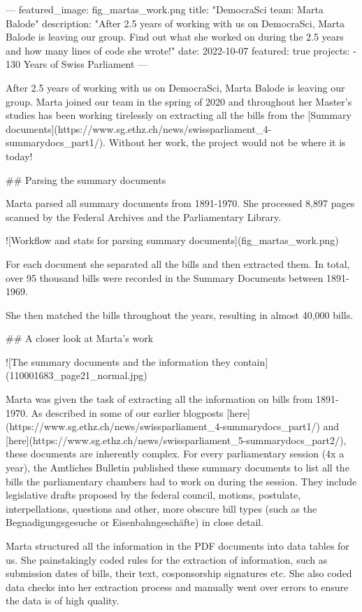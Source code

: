 ---
featured_image: fig_martas_work.png
title: "DemocraSci team: Marta Balode"
description: "After 2.5 years of working with us on DemocraSci, Marta Balode is leaving our group. Find out what she worked on during the 2.5 years and how many lines of code she wrote!"
date: 2022-10-07
featured: true
projects: 
  - 130 Years of Swiss Parliament
---

After 2.5 years of working with us on DemocraSci, Marta Balode is leaving our group. 
Marta joined our team in the spring of 2020 and throughout her Master's studies has been working tirelessly on extracting all the bills from the [Summary documents](https://www.sg.ethz.ch/news/swissparliament_4-summarydocs_part1/).
Without her work, the project would not be where it is today! 


## Parsing the summary documents

Marta parsed all summary documents from 1891-1970. She processed 8,897 pages scanned by the Federal Archives and the Parliamentary Library. 

![Workflow and stats for parsing summary documents](fig_martas_work.png)

For each document she separated all the bills and then extracted them. In total, over 95 thousand bills were recorded in the Summary Documents between 1891-1969. 

She then matched the bills throughout the years, resulting in almost 40,000 bills.

## A closer look at Marta's work

![The summary documents and the information they contain](110001683_page21_normal.jpg)

Marta was given the task of extracting all the information on bills from 1891-1970. As described in some of our earlier blogposts [here](https://www.sg.ethz.ch/news/swissparliament_4-summarydocs_part1/) and [here](https://www.sg.ethz.ch/news/swissparliament_5-summarydocs_part2/), these documents are inherently complex. For every parliamentary session (4x a year), the Amtliches Bulletin published these summary documents to list all the bills the parliamentary chambers had to work on during the session. They include legislative drafts proposed by the federal council, motions, postulate, interpellations, questions and other, more obscure bill types (such as the Begnadigungsgesuche or Eisenbahngeschäfte) in close detail.

Marta structured all the information in the PDF documents into data tables for us. She painstakingly coded rules for the extraction of information, such as submission dates of bills, their text, cosponsorship signatures etc. She also coded data checks into her extraction process and manually went over errors to ensure the data is of high quality. 

